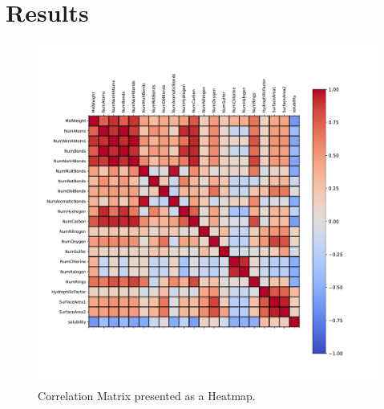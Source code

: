 \section{Results}

\begin{figure}[htbp!]
  \centerline{\includegraphics[width=0.7 \textwidth]{../../code/hw2/figures/1-correlation_matrix.pdf}}
  \caption{Correlation Matrix presented as a Heatmap.}
  \label{fig:1-correlation_matrix}
\end{figure}





\clearpage




